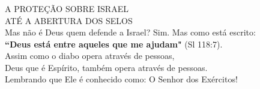 \documentclass[aspectratio=169]{beamer}
\author{Hélio Giroto}
\begin{document}


\begin{frame}
	  \frametitle{}
	  \framesubtitle{}
	  \centering
{\LARGE   A PROTEÇÃO SOBRE ISRAEL}\\
 {\LARGE ATÉ A ABERTURA DOS SELOS}\\
		\vspace{.5cm}
	Mas não é Deus quem defende a Israel? Sim. Mas como está escrito:\\
	\textbf{``Deus está entre aqueles que me ajudam"} (Sl 118:7). \\
			\vspace{.5cm}
	Assim como o diabo opera através de pessoas,\\
	Deus que é Espírito, também opera através de pessoas. \\
			\vspace{.5cm}
	{\small Lembrando que Ele é conhecido como: O Senhor dos Exércitos!}\\
\end{frame}
\end{document}
